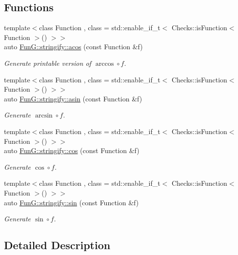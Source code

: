 \subsection*{Functions}
\begin{DoxyCompactItemize}
\item 
{\footnotesize template$<$class Function , class  = std\-::enable\-\_\-if\-\_\-t$<$ Checks\-::is\-Function$<$ Function $>$() $>$$>$ }\\auto \hyperlink{group__std_gaec458ee50fd7b49de4dc2ed1286e8286}{Fun\-G\-::stringify\-::acos} (const Function \&f)
\begin{DoxyCompactList}\small\item\em Generate printable version of $ \arccos\circ f $. \end{DoxyCompactList}\item 
{\footnotesize template$<$class Function , class  = std\-::enable\-\_\-if\-\_\-t$<$ Checks\-::is\-Function$<$ Function $>$() $>$$>$ }\\auto \hyperlink{group__std_gab50530d1358bb1d94ecaea4026fd83ea}{Fun\-G\-::stringify\-::asin} (const Function \&f)
\begin{DoxyCompactList}\small\item\em Generate $ \arcsin\circ f $. \end{DoxyCompactList}\item 
{\footnotesize template$<$class Function , class  = std\-::enable\-\_\-if\-\_\-t$<$ Checks\-::is\-Function$<$ Function $>$() $>$$>$ }\\auto \hyperlink{group__std_gaaa7d5292922e58b22115bc27d784dcfd}{Fun\-G\-::stringify\-::cos} (const Function \&f)
\begin{DoxyCompactList}\small\item\em Generate $ \cos\circ f $. \end{DoxyCompactList}\item 
{\footnotesize template$<$class Function , class  = std\-::enable\-\_\-if\-\_\-t$<$ Checks\-::is\-Function$<$ Function $>$() $>$$>$ }\\auto \hyperlink{group__std_gaa44ea064dbf1d4befb6766de66a994e5}{Fun\-G\-::stringify\-::sin} (const Function \&f)
\begin{DoxyCompactList}\small\item\em Generate $ \sin\circ f $. \end{DoxyCompactList}\end{DoxyCompactItemize}


\subsection{Detailed Description}


